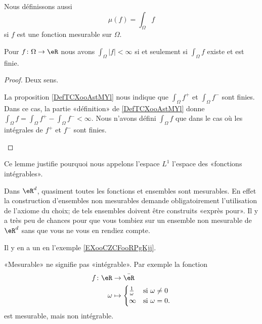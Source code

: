 Nous définissons aussi
\begin{equation}
	\mu(f)=\int_{\Omega}f
\end{equation}
si \( f\) est une fonction mesurable sur \( \Omega\).

\begin{lemma}       \label{LEMooMWKTooIKomSw}
	Pour \( f\colon \Omega\to \eR\) nous avons \( \int_{\Omega}| f |<\infty\) si et seulement si \( \int_{\Omega}f\) existe et est finie.
\end{lemma}

\begin{proof}
	Deux sens.
	\begin{subproof}
		\spitem[\( \Rightarrow\)]
		La proposition \ref{DefTCXooAstMYl} nous indique que \( \int_{\Omega}f^+\) et \( \int_{\Omega}f^-\) sont finies. Dans ce cas, la partie «définition» de \ref{DefTCXooAstMYl} donne \( \int_{\Omega}f=\int_{\Omega}f^+-\int_{\Omega}f^-<\infty\).
		\spitem[\( \Leftarrow\)]
		Nous n'avons défini \( \int_{\Omega}f\) que dans le cas où les intégrales de \( f^+\) et \( f^-\) sont finies.
	\end{subproof}
\end{proof}
Ce lemme justifie pourquoi nous appelons l'espace \( L^1\) l'espace des «fonctions intégrables».

\begin{remark}
	Dans \( \eR^d\), quasiment toutes les fonctions et ensembles sont mesurables. En effet la construction d'ensembles non mesurables demande obligatoirement l'utilisation de l'axiome du choix; de tels ensembles doivent être construits «exprès pour». Il y a très peu de chances pour que vous tombiez sur un ensemble non mesurable de \( \eR^d\) sans que vous ne vous en rendiez compte.

	Il y en a un en l'exemple \ref{EXooCZCFooRPgKjj}.
\end{remark}

\begin{remark}
	«Mesurable» ne signifie pas «intégrable». Par exemple la fonction
	\begin{equation}
		\begin{aligned}
			f\colon \eR & \to \bar\eR                                         \\
			\omega      & \mapsto\begin{cases}
				                     \frac{1}{ \omega } & \text{si } \omega\neq 0 \\
				                     \infty             & \text{si }\omega=0.
			                     \end{cases}
		\end{aligned}
	\end{equation}
	est mesurable, mais non intégrable.
\end{remark}

